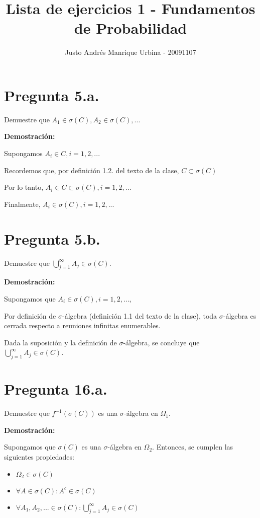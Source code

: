 \documentclass[11pt]{article}
\title{Lista de ejercicios 1 - Fundamentos de Probabilidad}
\begin{document}
\maketitle
\author{Justo Andrés Manrique Urbina - 20091107}

\section{Pregunta 5.a.}

Demuestre que $\mathit{A}_{1} \in \sigma(C), \mathit{A}_{2} \in \sigma(C), ...$

\textbf{Demostración:}

Supongamos $\mathit{A}_{i} \in C, i=1,2, ...$

Recordemos que, por definición 1.2. del texto de la clase, $C \subset \sigma(C)$

Por lo tanto, $\mathit{A}_{i} \in C \subset \sigma(C), i=1,2, ...$

Finalmente, $\mathit{A}_{i} \in \sigma(C), i=1,2, ...$

\section{Pregunta 5.b.}
Demuestre que $\bigcup^{\infty}_{j=1} A_{j} \in \sigma(C)$.

\textbf{Demostración:}

Supongamos que $\mathit{A}_{i} \in \sigma(C), i=1,2, ...$,

Por definición de $\sigma$-álgebra (definición 1.1 del texto de la clase), toda $\sigma$-álgebra es cerrada respecto a reuniones infinitas enumerables.

Dada la suposición y la definición de $\sigma$-álgebra, se concluye que  $\bigcup^{\infty}_{j=1} A_{j} \in \sigma(C)$.

\section{Pregunta 16.a.}
Demuestre que $\mathit{f}^{-1} (\sigma(C))$ es una $\sigma$-álgebra en $\Omega_{1}$.

\textbf{Demostración:}

Supongamos que $\sigma(C)$ es una $\sigma$-álgebra en $\Omega_{2}$. Entonces, se cumplen las siguientes propiedades:

\begin{itemize}
	\item $\Omega_{2} \in \sigma(C)$
	\item $\forall \mathit{A} \in \sigma(C): \mathit{A}^{c} \in \sigma(C)$
	\item $\forall \mathit{A}_{1},\mathit{A}_{2}, ... \in \sigma(C): \bigcup^{\infty}_{j=1} A_{j} \in \sigma(C)$
\end{itemize}
\end{document}
